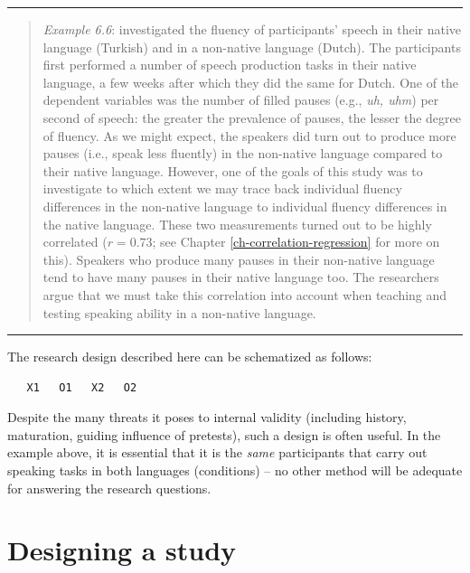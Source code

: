 \documentclass[
]{book}
\begin{document}
\begin{center}\rule{0.5\linewidth}{0.5pt}\end{center}

\begin{quote}
\emph{Example 6.6}: \citet{JGSH13} investigated the fluency of participants' speech in their native language (Turkish) and in a non-native language (Dutch). The participants first performed a number of speech production tasks in their native language, a few weeks after which they did the same for Dutch. One of the dependent variables was the number of filled pauses (e.g., \emph{uh, uhm}) per second of speech: the greater the prevalence of pauses, the lesser the degree of fluency. As we might expect, the speakers did turn out to produce more pauses (i.e., speak less fluently) in the non-native language compared to their native language. However, one of the goals of this study was to investigate to which extent we may trace back individual fluency differences in the non-native language to individual fluency differences in the native language. These two measurements turned out to be highly correlated (\(r = 0.73\); see Chapter \ref{ch-correlation-regression} for more on this). Speakers who produce many pauses in their non-native language tend to have many pauses in their native language too. The researchers argue that we must take this correlation into account when teaching and testing speaking ability in a non-native language.
\end{quote}

\begin{center}\rule{0.5\linewidth}{0.5pt}\end{center}

The research design described here can be schematized as follows:

\begin{verbatim}
   X1   O1   X2   O2
\end{verbatim}

Despite the many threats it poses to internal validity (including history, maturation, guiding influence of pretests), such a design is often useful. In the example above, it is essential that it is the \emph{same} participants that carry out speaking tasks in both languages (conditions) -- no other method will be adequate for answering the research questions.

\section{Designing a study}\label{designing-a-study}
\end{document}
